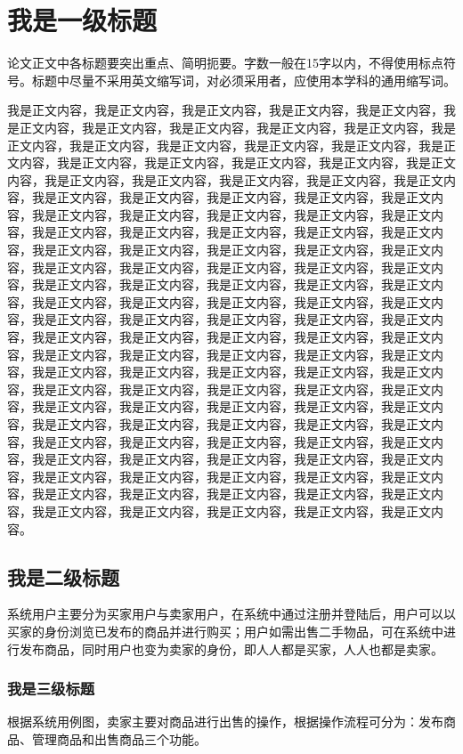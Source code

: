 \chapter{我是一级标题}
论文正文中各标题要突出重点、简明扼要。字数一般在15字以内，不得使用标点符号。标题中尽量不采用英文缩写词，对必须采用者，应使用本学科的通用缩写词。

我是正文内容，我是正文内容，我是正文内容，我是正文内容，我是正文内容，我是正文内容，我是正文内容，我是正文内容，我是正文内容，我是正文内容，我是正文内容，我是正文内容，我是正文内容，我是正文内容，我是正文内容，我是正文内容，我是正文内容，我是正文内容，我是正文内容，我是正文内容，我是正文内容，我是正文内容，我是正文内容，我是正文内容，我是正文内容，我是正文内容，我是正文内容，我是正文内容，我是正文内容，我是正文内容，我是正文内容，我是正文内容，我是正文内容，我是正文内容，我是正文内容，我是正文内容，我是正文内容，我是正文内容，我是正文内容，我是正文内容，我是正文内容，我是正文内容，我是正文内容，我是正文内容，我是正文内容，我是正文内容，我是正文内容，我是正文内容，我是正文内容，我是正文内容，我是正文内容，我是正文内容，我是正文内容，我是正文内容，我是正文内容，我是正文内容，我是正文内容，我是正文内容，我是正文内容，我是正文内容，我是正文内容，我是正文内容，我是正文内容，我是正文内容，我是正文内容，我是正文内容，我是正文内容，我是正文内容，我是正文内容，我是正文内容，我是正文内容，我是正文内容，我是正文内容，我是正文内容，我是正文内容，我是正文内容，我是正文内容，我是正文内容，我是正文内容，我是正文内容，我是正文内容，我是正文内容，我是正文内容，我是正文内容，我是正文内容，我是正文内容，我是正文内容，我是正文内容，我是正文内容，我是正文内容，我是正文内容，我是正文内容，我是正文内容，我是正文内容，我是正文内容，我是正文内容，我是正文内容，我是正文内容，我是正文内容，我是正文内容，我是正文内容，我是正文内容，我是正文内容，我是正文内容，我是正文内容，我是正文内容，我是正文内容，我是正文内容，我是正文内容，我是正文内容，我是正文内容，我是正文内容，我是正文内容，我是正文内容，我是正文内容，我是正文内容，我是正文内容，我是正文内容，我是正文内容，我是正文内容，我是正文内容。
\section{我是二级标题}
系统用户主要分为买家用户与卖家用户，在系统中通过注册并登陆后，用户可以以买家的身份浏览已发布的商品并进行购买；用户如需出售二手物品，可在系统中进行发布商品，同时用户也变为卖家的身份，即人人都是买家，人人也都是卖家。
\subsection{我是三级标题}
根据系统用例图，卖家主要对商品进行出售的操作，根据操作流程可分为：发布商品、管理商品和出售商品三个功能。